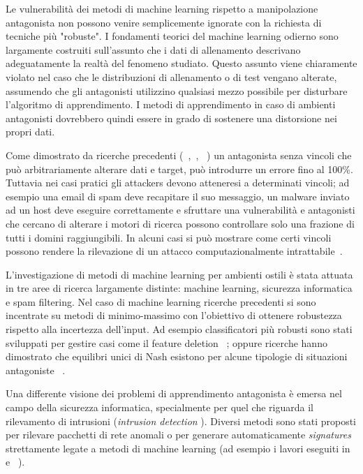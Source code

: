 Le vulnerabilità dei metodi di machine learning rispetto a manipolazione antagonista non possono venire semplicemente ignorate con la richiesta di tecniche più "robuste". I fondamenti teorici del machine learning odierno sono largamente costruiti sull'assunto che i dati di allenamento descrivano adeguatamente la realtà del fenomeno studiato. Questo assunto viene chiaramente violato nel caso che le distribuzioni di allenamento o di test vengano alterate, assumendo che gli antagonisti utilizzino qualsiasi mezzo possibile per disturbare l'algoritmo di apprendimento. I metodi di apprendimento in caso di ambienti antagonisti dovrebbero quindi essere in grado di sostenere una distorsione nei propri dati.

Come dimostrato da ricerche precedenti (~\cite{kearnsli},~\cite{Auer2002},~\cite{paclearning} ) un antagonista senza vincoli che può arbitrariamente alterare dati e target, può introdurre un errore fino al 100\%. Tuttavia nei casi pratici gli attackers devono atteneresi a determinati vincoli; ad esempio una email di spam deve recapitare il suo messaggio, un malware inviato ad un host deve eseguire correttamente e sfruttare una vulnerabilità e antagonisti che cercano di alterare i motori di ricerca possono controllare solo una frazione di tutti i domini raggiungibili. In alcuni casi si può mostrare come certi vincoli possono rendere la rilevazione di un attacco computazionalmente intrattabile~\cite{fogla}.

L'investigazione di metodi di machine learning per ambienti ostili è stata attuata in tre aree di ricerca largamente distinte: machine learning, sicurezza informatica e spam filtering. Nel caso di machine learning ricerche precedenti si sono incentrate su metodi di minimo-massimo con l'obiettivo di ottenere robustezza rispetto alla incertezza dell'input. Ad esempio classificatori più robusti sono stati sviluppati per gestire casi come il feature deletion~\cite{globerson} ; oppure ricerche hanno dimostrato che equilibri unici di Nash esistono per alcune tipologie di situazioni antagoniste~\cite{nash} .

Una differente visione dei problemi di apprendimento antagonista è emersa nel campo della sicurezza informatica, specialmente per quel che riguarda il rilevamento di intrusioni (\textit{intrusion detection} ). Diversi metodi sono stati proposti per rilevare pacchetti di rete anomali o per generare automaticamente \textit{signatures} strettamente legate a metodi di machine learning (ad esempio i lavori eseguiti in~\cite{wangstolfo} e~\cite{wang2006} ).

